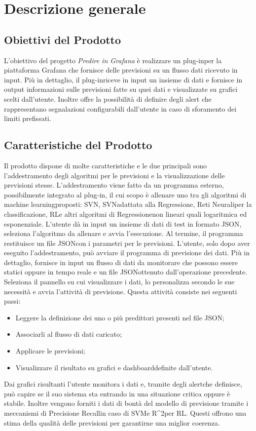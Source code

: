 \section{Descrizione generale}
	\subsection{Obiettivi del Prodotto}
	L'obiettivo del progetto \textit{Predire in Grafana} è realizzare un plug-in\glosp per la piattaforma Grafana che fornisce delle previsioni su un flusso dati ricevuto in input.
	Più in dettaglio, il plug-in\glosp riceve in input un insieme di dati e fornisce in output informazioni sulle previsioni fatte su quei dati e visualizzate su grafici scelti dall'utente. Inoltre offre la possibilità di definire degli alert che rappresentano segnalazioni configurabili dall'utente in caso di sforamento dei limiti prefissati. 
	\subsection{Caratteristiche del Prodotto}
	Il prodotto dispone di molte caratteristiche e le due principali sono l'addestramento degli algoritmi per le previsioni e la visualizzazione delle previsioni stesse.
	L'addestramento viene fatto da un programma esterno, possibilmente integrato al plug-in, il cui scopo è allenare uno tra gli algoritmi di machine learning\glosp proposti: SVN\glosp, SVN\glosp adattata alla Regressione\glo, Reti Neurali\glosp per la classificazione, RL\glo e altri algoritmi di Regressione\glosp non lineari quali logaritmica ed esponenziale. L'utente dà in input un insieme di dati di test in formato JSON\glosp, seleziona l'algoritmo da allenare e avvia l'esecuzione. Al termine, il programma restituisce un file JSON\glosp con i parametri per le previsioni.
	L'utente, solo dopo aver eseguito l'addestramento, può avviare il programma di previsione dei dati. Più in dettaglio, fornisce in input un flusso di dati da monitorare che possono essere statici oppure in tempo reale e un file JSON\glosp ottenuto dall'operazione precedente. Seleziona il pannello su cui visualizzare i dati, lo personalizza secondo le sue necessità e avvia l'attività di previsione. Questa attività consiste nei seguenti passi:
	\begin{itemize}
		\item Leggere la definizione dei uno o più predittori presenti nel file JSON\glosp;
		\item Associarli al flusso di dati caricato;
		\item Applicare le previsioni;
		\item Visualizzare il risultato su grafici e dashboard\glosp definite dall'utente.
	\end{itemize}
	Dai grafici risultanti l'utente monitora i dati e, tramite degli alert\glosp che definisce, può capire se il suo sistema sta entrando in una situazione critica oppure è stabile.
	Inoltre vengono forniti i dati di bontà del modello di previsione tramite i meccanismi di Precision\glosp e Recall\glosp in caso di SVM\glosp e R^2\glosp per RL\glosp. Questi offrono una stima della qualità delle previsioni per garantirne una miglior coerenza.

